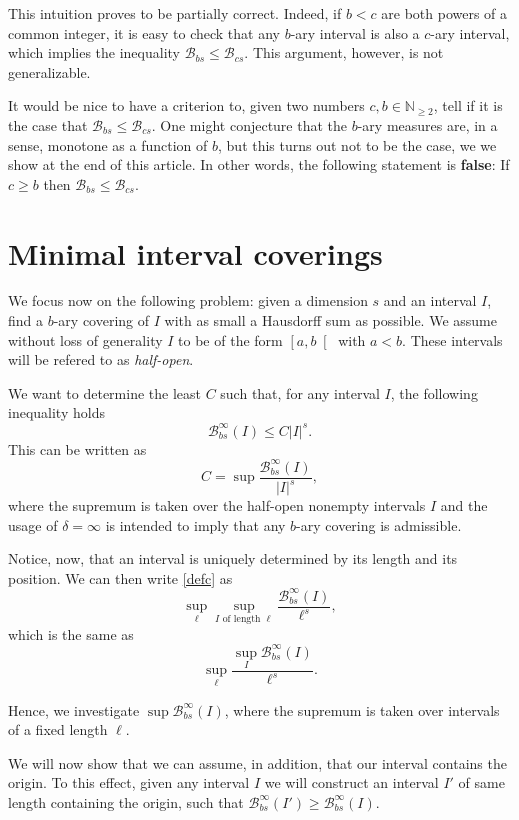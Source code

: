 \documentclass[11pt, reqno]{amsart}
\newcommand{\N}{\mathbb{N}}
\newcommand{\BB}{\mathcal{B}}
\begin{document}
This intuition proves to be partially correct. Indeed, if $b < c$ are both powers of a common integer, it is easy to check that any $b$-ary interval is also a $c$-ary interval, which implies the inequality $\BB_{bs} \leq \BB_{cs}$. This argument, however, is not generalizable.

It would be nice to have a criterion to, given two numbers $c, b \in \N_{\geq 2}$, tell if it is the case that $\BB_{bs} \leq \BB_{cs}$. One might conjecture that the $b$-ary measures are, in a sense, monotone as a function of $b$, but this turns out not to be the case, we we show at the end of this article. In other words, the following statement is \textbf{false}: If $c \geq b$ then $\BB_{bs} \leq \BB_{cs}$.

\section{Minimal interval coverings}\label{sec5}

We focus now on the following problem: given a dimension $s$ and an interval $I$, find a $b$-ary covering of $I$ with as small a Hausdorff sum as possible. We assume without loss of generality $I$ to be of the form $\left[ a, b \right[$ with $a < b$. These intervals will be refered to as \emph{half-open}.

We want to determine the least  $C$ such that, for any interval $I$, the following inequality holds
$$\BB_{bs}^\infty(I) \leq C \lvert I \rvert^s.$$
 This can be written as
\begin{equation}\label{defc}
C = \sup \frac{\BB_{bs}^\infty(I)}{\lvert I \rvert^s},
\end{equation}
where the supremum is taken over the half-open nonempty intervals $I$ and the usage of $\delta = \infty$ is intended to imply that any $b$-ary covering is admissible.

Notice, now, that an interval is uniquely determined by its length and its position. We can then write \eqref{defc} as
\[\sup_\ell \sup_\text{$I$ of length $\ell$} \frac{\BB_{bs}^\infty(I)}{\ell^s},\]
which is the same as
\[\sup_\ell \frac{\sup_I \BB_{bs}^\infty(I)}{\ell^s}.\]

Hence, we investigate $\sup \BB_{bs}^\infty(I)$, where the supremum is taken over intervals of a fixed length $\ell$.

We will now show that we can assume, in addition, that our interval contains the origin. To this effect, given any interval $I$ we will construct an interval $I'$ of same length containing the origin, such that $\BB_{bs}^\infty(I') \geq \BB_{bs}^\infty(I)$.
\end{document}
